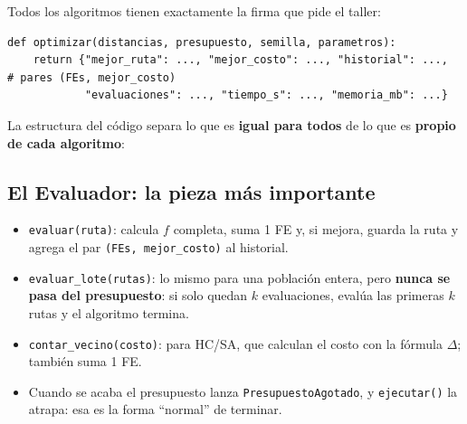 \documentclass[11pt,a4paper]{article}
\newcommand{\FEs}{\textsc{FEs}}
\begin{document}
Todos los algoritmos tienen exactamente la firma que pide el taller:
\begin{lstlisting}
def optimizar(distancias, presupuesto, semilla, parametros):
    return {"mejor_ruta": ..., "mejor_costo": ..., "historial": ...,  # pares (FEs, mejor_costo)
            "evaluaciones": ..., "tiempo_s": ..., "memoria_mb": ...}
\end{lstlisting}

La estructura del código separa lo que es \textbf{igual para todos} de lo que es \textbf{propio de cada algoritmo}:

\begin{center}
\end{center}

\subsection{El Evaluador: la pieza más importante}

\begin{codigo}
\begin{itemize}
\item \texttt{evaluar(ruta)}: calcula $f$ completa, suma 1 FE y, si mejora, guarda la ruta y agrega el par \texttt{(FEs, mejor\_costo)} al historial.
\item \texttt{evaluar\_lote(rutas)}: lo mismo para una población entera, pero \textbf{nunca se pasa del presupuesto}: si solo quedan $k$ evaluaciones,
      evalúa las primeras $k$ rutas y el algoritmo termina.
\item \texttt{contar\_vecino(costo)}: para HC/SA, que calculan el costo con la fórmula $\Delta$; también suma 1 FE.
\item Cuando se acaba el presupuesto lanza \texttt{PresupuestoAgotado}, y \texttt{ejecutar()} la atrapa: esa es la forma ``normal'' de terminar.
\end{itemize}
\end{codigo}
\end{document}
